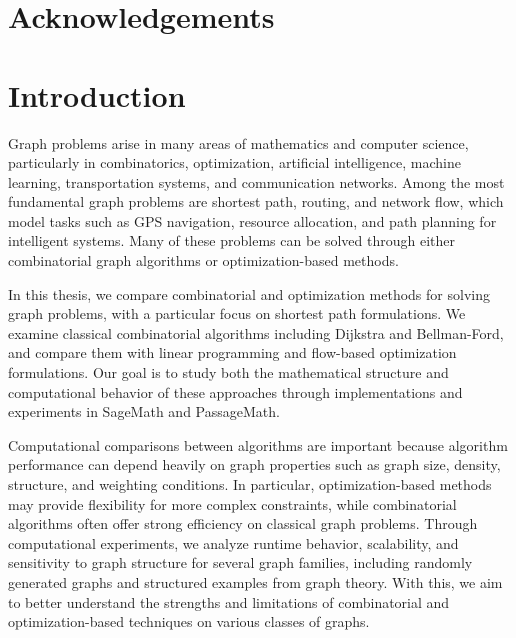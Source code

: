 \documentclass[12pt]{report}
\begin{document}
\tableofcontents
\newpage


\chapter*{Acknowledgements}


\newpage


\chapter*{Introduction}

Graph problems arise in many areas of mathematics and computer science, particularly in combinatorics, optimization, artificial intelligence, machine learning, transportation systems, and communication networks. Among the most fundamental graph problems are shortest path, routing, and network flow, which model tasks such as GPS navigation, resource allocation, and path planning for intelligent systems. Many of these problems can be solved through either combinatorial graph algorithms or optimization-based methods.

In this thesis, we compare combinatorial and optimization methods for solving graph problems, with a particular focus on shortest path formulations. We examine classical combinatorial algorithms including Dijkstra and Bellman-Ford, and compare them with linear programming and flow-based optimization formulations. Our goal is to study both the mathematical structure and computational behavior of these approaches through implementations and experiments in SageMath and PassageMath.

Computational comparisons between algorithms are important because algorithm performance can depend heavily on graph properties such as graph size, density, structure, and weighting conditions. In particular, optimization-based methods may provide flexibility for more complex constraints, while combinatorial algorithms often offer strong efficiency on classical graph problems. Through computational experiments, we analyze runtime behavior, scalability, and sensitivity to graph structure for several graph families, including randomly generated graphs and structured examples from graph theory. With this, we aim to better understand the strengths and limitations of combinatorial and optimization-based techniques on various classes of graphs.
\end{document}
